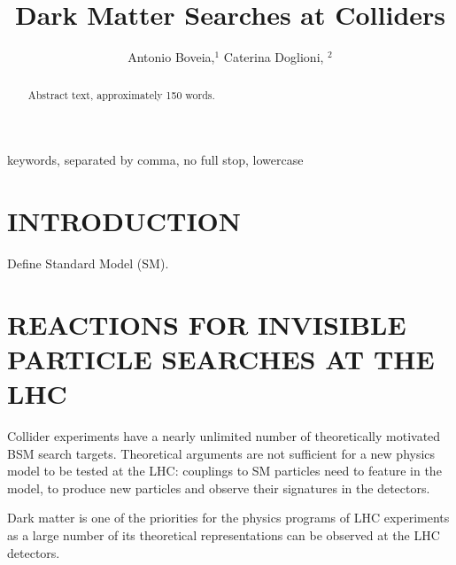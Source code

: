 \documentclass{ar-1col}
\begin{document}

\title{Dark Matter Searches at Colliders}


\author{Antonio Boveia,$^1$ Caterina Doglioni, $^2$
}

\begin{abstract}
Abstract text, approximately 150 words. 
\end{abstract}

\begin{keywords}
keywords, separated by comma, no full stop, lowercase
\end{keywords}
\maketitle

\tableofcontents


\section{INTRODUCTION}
\label{sec:intro}

Define Standard Model (SM). 


%

\section{REACTIONS FOR INVISIBLE PARTICLE SEARCHES AT THE LHC}




Collider experiments have a nearly unlimited number of theoretically motivated BSM search targets. 
Theoretical arguments are not sufficient for a new physics model to be tested at the LHC: 
couplings to SM particles need to feature in the model, to produce new particles and observe 
their signatures in the detectors. 

Dark matter is one of the priorities for the physics programs of LHC experiments
as a large number of its theoretical representations can be observed at the LHC detectors. 
\end{document}
